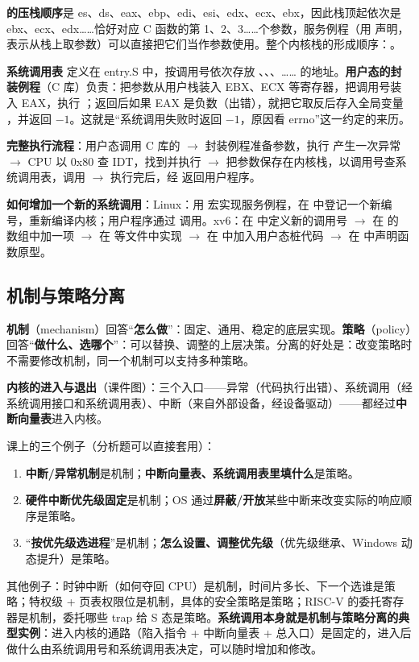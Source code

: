 \textbf{ 的压栈顺序}是 es、ds、eax、ebp、edi、esi、edx、ecx、ebx，因此栈顶起依次是 ebx、ecx、edx……恰好对应 C 函数的第 1、2、3……个参数，服务例程（用  声明，表示从栈上取参数）可以直接把它们当作参数使用。\ez 整个内核栈的形成顺序：。

\textbf{系统调用表}  定义在 entry.S 中，按调用号依次存放 、、、…… 的地址。\textbf{用户态的封装例程}（C 库）负责：把参数从用户栈装入 EBX、ECX 等寄存器，把调用号装入 EAX，执行 ；返回后如果 EAX 是负数（出错），就把它取反后存入全局变量 ，并返回 $-1$。这就是“系统调用失败时返回 $-1$，原因看 errno”这一约定的来历。

\textbf{完整执行流程}：用户态调用 C 库的  $\to$ 封装例程准备参数，执行  产生一次异常 $\to$ CPU 以 0x80 查 IDT，找到并执行  $\to$  把参数保存在内核栈，以调用号查系统调用表，调用  $\to$  执行完后，经  返回用户程序。

\textbf{如何增加一个新的系统调用}：Linux：用  宏实现服务例程，在  中登记一个新编号，重新编译内核；用户程序通过  调用。xv6：在  中定义新的调用号 $\to$ 在  的  数组中加一项 $\to$ 在  等文件中实现  $\to$ 在  中加入用户态桩代码 $\to$ 在  中声明函数原型。

\subsection{机制与策略分离}

\textbf{机制}（mechanism）回答“\textbf{怎么做}”：固定、通用、稳定的底层实现。\textbf{策略}（policy）回答“\textbf{做什么、选哪个}”：可以替换、调整的上层决策。分离的好处是：改变策略时不需要修改机制，同一个机制可以支持多种策略。

\textbf{内核的进入与退出}（课件图）：三个入口——异常（代码执行出错）、系统调用（经系统调用接口和系统调用表）、中断（来自外部设备，经设备驱动）——都经过\textbf{中断向量表}进入内核。

课上的三个例子（分析题可以直接套用）：
\begin{enumerate}
    \item \textbf{中断/异常机制}是机制；\textbf{中断向量表、系统调用表里填什么}是策略。
    \item \textbf{硬件中断优先级固定}是机制；OS 通过\textbf{屏蔽/开放}某些中断来改变实际的响应顺序是策略。
    \item “\textbf{按优先级选进程}”是机制；\textbf{怎么设置、调整优先级}（优先级继承、Windows 动态提升）是策略。
\end{enumerate}
其他例子：时钟中断（如何夺回 CPU）是机制，时间片多长、下一个选谁是策略；特权级 + 页表权限位是机制，具体的安全策略是策略；RISC-V 的委托寄存器是机制，委托哪些 trap 给 S 态是策略。\textbf{系统调用本身就是机制与策略分离的典型实例}：进入内核的通路（陷入指令 + 中断向量表 + 总入口）是固定的，进入后做什么由系统调用号和系统调用表决定，可以随时增加和修改。

